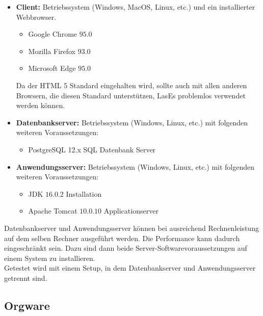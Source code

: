 \begin{itemize}

	\item \textbf{Client:} Betriebssystem (Windows, MacOS, Linux, etc.) und ein installierter Webbrowser.

	\begin{itemize}
		\item Google Chrome $95.0$
		\item Mozilla Firefox $93.0$
		\item Microsoft Edge $95.0$
	\end{itemize}

	Da der HTML 5 Standard eingehalten wird, sollte auch mit allen anderen Browsern, die diesen Standard unterstützen, LasEs problemlos verwendet werden können.

	\item \textbf{Datenbankserver:} Betriebssystem (Windows, Linux, etc.) mit folgenden weiteren Voraussetzungen:

	\begin{itemize}
		\item PostgreSQL 12.x SQL Datenbank Server
	\end{itemize}

	\item \textbf{Anwendungsserver:} Betriebssystem (Windows, Linux, etc.) mit folgenden weiteren Voraussetzungen:

	\begin{itemize}
		\item JDK $16.0.2$ Installation
		\item Apache Tomcat $10.0.10$ Applicationserver
	\end{itemize}

\end{itemize}

	Datenbankserver und Anwendungsserver können bei ausreichend Rechnenleistung auf dem selben Rechner ausgeführt werden. Die Performance kann dadurch eingeschränkt sein. Dazu sind dann beide Server-Softwarevoraussetzungen auf einem System zu installieren.\\
	Getestet wird mit einem Setup, in dem Datenbankserver und Anwendungsserver getrennt sind.

\subsection{Orgware}

